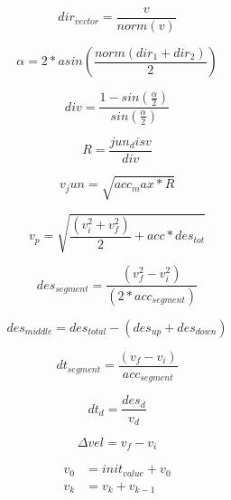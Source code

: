 \begin{equation}
    \label{eq:dir_eq}
    dir_{vector} = \frac{v}{norm(v)}
\end{equation}

\begin{equation}
    \label{eq:alpha}
    \alpha = 2*asin\left(\frac{norm(dir_1+dir_2)}{2}\right)
\end{equation}

\begin{equation}
    \label{eq:div}
    div = \frac{1-sin\left(\frac{\alpha}{2}\right)}{sin(\frac{\alpha}{2})}
\end{equation}

\begin{equation}
    \label{eq:R_jun}
    R = \frac{jun_disv}{div}
\end{equation}

\begin{equation}
    \label{eq:v_jun}
    v_jun = \sqrt{acc_max*R}
\end{equation}





\begin{equation}
    \label{eq:v_p}
    v_p = \sqrt{\frac{(v_i^2+v_f^2)}{2}+acc*des_{tot}}
\end{equation}

\begin{equation}
    \label{eq:des_seg_acc}
    des_{segment} = \frac{(v_f^2-v_i^2)}{(2*acc_{segment})}
\end{equation}

\begin{equation}
    \label{eq:des_seg_no_acc}
    des_{middle} = des_{total}-(des_{up}+des_{down})
\end{equation}

\begin{equation}
    \label{eq:dt_seg_acc}
    dt_{segment} = \frac{(v_f-v_i)}{acc_{segment}}
\end{equation}

\begin{equation}
    \label{eq:dt_seg_no_acc}
    dt_d = \frac{des_d}{v_d}
\end{equation}

\begin{equation}
    \label{eq:delta_vel}
    \Delta vel = v_f-v_i
\end{equation}

\begin{equation}
    \label{eq:acumulator_function}
    \begin{split}
        v_{0} &= init_{value} + v_{0} \\
        v_k &= v_k+v_{k-1}
    \end{split}
\end{equation}

